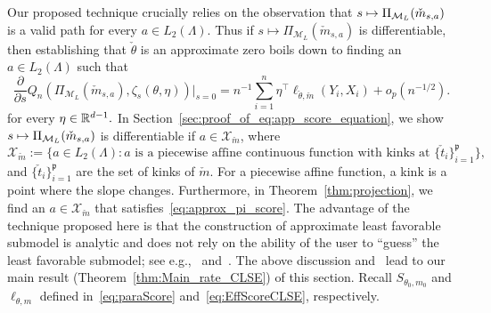 { Our proposed technique crucially relies on the observation that $s \mapsto \Pi_{\mathcal{M}_L}(\check{m}_{s,a})$ is a valid path for every $a\in L_2(\Lambda)$.  Thus if $s\mapsto \Pi_{\mathcal{M}_L}(\check{m}_{s,a})$ is differentiable, then establishing that $\check{\theta}$ is an approximate zero boils down to finding an $a\in L_2(\Lambda)$ such that 
 \begin{equation}\label{eq:approx_pi_score}
 \frac{\partial }{\partial s}Q_n(\Pi_{\mathcal{M}_L}(\check{m}_{s,a}), \zeta_s(\theta,\eta))\Big|_{s = 0}= n^{-1}\sum_{i=1}^n \eta^\top \ell_{\check{\theta}, \check{m}}(Y_i, X_i) +o_p(n^{-1/2}).
 \end{equation}
 for every $\eta \in \mathbb{R}^{d-1}. $  In Section~\ref{sec:proof_of_eq:app_score_equation}, we show $s \mapsto \Pi_{\mathcal{M}_L}(\check{m}_{s, a})$ is differentiable if $a \in \mathcal{X}_{\check{m}}$, where 
 \begin{equation}\label{eq:X_m_def}
 \mathcal{X}_{\check{m}} :=\big\{a\in L_2(\Lambda): a \text{ is a piecewise affine continuous function with kinks at }\{\check{t}_i\}_{i=1}^\mathfrak{p}\big\},
 \end{equation}
 and $\{\check{t}_i\}_{i=1}^\mathfrak{p}$ are the set of  kinks of $\check{m}$. For  a piecewise affine function, a kink is a point where the slope changes. Furthermore, in Theorem~\ref{thm:projection}, we find an $a\in \mathcal{X}_{\check{m}}$ that satisfies~\eqref{eq:approx_pi_score}. The advantage of the technique proposed here is that the construction of approximate least favorable submodel is  analytic and does not rely on the ability of the user to ``guess'' the least favorable submodel; see e.g.,~\cite[Section 9.2-9.3]{VdV02} and~\cite{VANC}. The above discussion and~\cite[Theorem 6.20]{VdV02} lead to our main result (Theorem~\ref{thm:Main_rate_CLSE}) of this section.  Recall $S_{\theta_0,m_0}$ and $\ell_{\theta,m}$  defined in~\eqref{eq:paraScore} and~\eqref{eq:EffScoreCLSE}, respectively.
}

